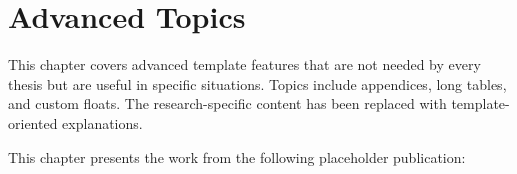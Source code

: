 \chapter{Advanced Topics}
\glsresetall

\begin{cabstract}
This chapter covers advanced template features that are not needed by every thesis but are useful in specific situations. Topics include appendices, long tables, and custom floats. The research-specific content has been replaced with template-oriented explanations.
\end{cabstract}

This chapter presents the work from the following placeholder publication:







